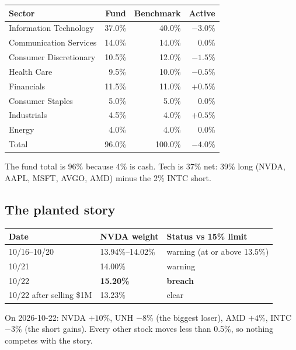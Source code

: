 \documentclass[11pt]{article}
\begin{document}
\begin{center}
\begin{tabular}{@{}lrrr@{}}
\toprule
\textbf{Sector} & \textbf{Fund} & \textbf{Benchmark} & \textbf{Active} \\
\midrule
Information Technology & 37.0\% & 40.0\% & $-3.0\%$ \\
Communication Services & 14.0\% & 14.0\% & 0.0\% \\
Consumer Discretionary & 10.5\% & 12.0\% & $-1.5\%$ \\
Health Care            & 9.5\%  & 10.0\% & $-0.5\%$ \\
Financials             & 11.5\% & 11.0\% & $+0.5\%$ \\
Consumer Staples       & 5.0\%  & 5.0\%  & 0.0\% \\
Industrials            & 4.5\%  & 4.0\%  & $+0.5\%$ \\
Energy                 & 4.0\%  & 4.0\%  & 0.0\% \\
\midrule
Total                  & 96.0\% & 100.0\% & $-4.0\%$ \\
\bottomrule
\end{tabular}
\end{center}

The fund total is 96\% because 4\% is cash. Tech is 37\% net: 39\% long (NVDA, AAPL, MSFT,
AVGO, AMD) minus the 2\% INTC short.

\subsection{The planted story}\label{sec:m1a-story}

\begin{center}
\begin{tabular}{@{}lll@{}}
\toprule
\textbf{Date} & \textbf{NVDA weight} & \textbf{Status vs 15\% limit} \\
\midrule
10/16--10/20 & 13.94\%--14.02\% & warning (at or above 13.5\%) \\
10/21        & 14.00\% & warning \\
10/22        & \textbf{15.20\%} & \textbf{breach} \\
10/22 after selling \$1M & 13.23\% & clear \\
\bottomrule
\end{tabular}
\end{center}

On 2026-10-22: NVDA $+10\%$, UNH $-8\%$ (the biggest loser), AMD $+4\%$, INTC $-3\%$ (the short
gains). Every other stock moves less than 0.5\%, so nothing competes with the story.
\end{document}
